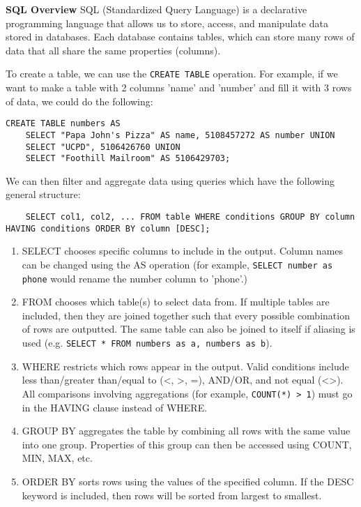 \textbf{SQL Overview} 
SQL (Standardized Query Language) is a declarative programming language that allows us to store, access, and manipulate data stored in databases.
Each database contains tables, which can store many rows of data that all share the same properties (columns). 

To create a table, we can use the \texttt{CREATE TABLE} operation. For example, if we want to make a table with 2 columns 'name' and 'number' and fill it with 3 rows of data, we could do the following:
\begin{lstlisting}
CREATE TABLE numbers AS
    SELECT "Papa John's Pizza" AS name, 5108457272 AS number UNION
    SELECT "UCPD", 5106426760 UNION
    SELECT "Foothill Mailroom" AS 5106429703;
\end{lstlisting}

We can then filter and aggregate data using queries which have the following general structure:
\begin{lstlisting}
    SELECT col1, col2, ... FROM table WHERE conditions GROUP BY column HAVING conditions ORDER BY column [DESC];
\end{lstlisting}
\begin{enumerate}
    \item SELECT chooses specific columns to include in the output. Column names can be changed using the AS operation (for example, \texttt{SELECT number as phone} would rename the number column to 'phone'.)
    \item FROM chooses which table(s) to select data from. If multiple tables are included, then they are joined together such that every possible combination of rows are outputted. The same table can also be joined to itself if aliasing is used (e.g. \texttt{SELECT * FROM numbers as a, numbers as b}).
    \item WHERE restricts which rows appear in the output. Valid conditions include less than/greater than/equal to (<, >, =), AND/OR, and not equal (<>). All comparisons involving aggregations (for example, \texttt{COUNT(*) > 1}) must go in the HAVING clause instead of WHERE.
    \item GROUP BY aggregates the table by combining all rows with the same value into one group. Properties of this group can then be accessed using COUNT, MIN, MAX, etc.
    \item ORDER BY sorts rows using the values of the specified column. If the DESC keyword is included, then rows will be sorted from largest to smallest.
\end{enumerate}
